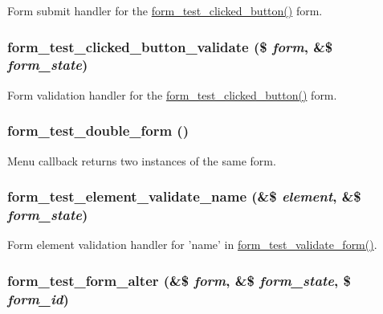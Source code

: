 \label{form__test_8module_aa388c64a1f253abfc751941581b5ce1d}
Form submit handler for the \hyperlink{form__test_8module_abd0f05e7f6231b50394fab3668290438}{form\_\-test\_\-clicked\_\-button()} form. \hypertarget{form__test_8module_a5795e527b85244ec38910d4ca9bcd3ba}{
\subsubsection[{form\_\-test\_\-clicked\_\-button\_\-validate}]{\setlength{\rightskip}{0pt plus 5cm}form\_\-test\_\-clicked\_\-button\_\-validate (\$ {\em form}, \/  \&\$ {\em form\_\-state})}}
\label{form__test_8module_a5795e527b85244ec38910d4ca9bcd3ba}
Form validation handler for the \hyperlink{form__test_8module_abd0f05e7f6231b50394fab3668290438}{form\_\-test\_\-clicked\_\-button()} form. \hypertarget{form__test_8module_acbe9a5b2d93fddf286196506d42508b5}{
\subsubsection[{form\_\-test\_\-double\_\-form}]{\setlength{\rightskip}{0pt plus 5cm}form\_\-test\_\-double\_\-form ()}}
\label{form__test_8module_acbe9a5b2d93fddf286196506d42508b5}
Menu callback returns two instances of the same form. \hypertarget{form__test_8module_a4db639893c06b223ab87875dccb0ff80}{
\subsubsection[{form\_\-test\_\-element\_\-validate\_\-name}]{\setlength{\rightskip}{0pt plus 5cm}form\_\-test\_\-element\_\-validate\_\-name (\&\$ {\em element}, \/  \&\$ {\em form\_\-state})}}
\label{form__test_8module_a4db639893c06b223ab87875dccb0ff80}
Form element validation handler for 'name' in \hyperlink{form__test_8module_a0407b03ec9fd246fee1c31844bb5ffbc}{form\_\-test\_\-validate\_\-form()}. \hypertarget{form__test_8module_afc7a8dae00439af9b34292e9688702fa}{
\subsubsection[{form\_\-test\_\-form\_\-alter}]{\setlength{\rightskip}{0pt plus 5cm}form\_\-test\_\-form\_\-alter (\&\$ {\em form}, \/  \&\$ {\em form\_\-state}, \/  \$ {\em form\_\-id})}}
